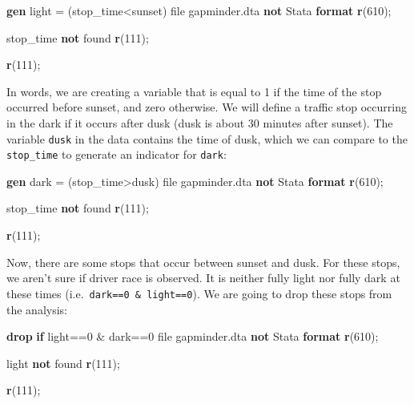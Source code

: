 \documentclass[
]{book}
\newenvironment{Shaded}{\begin{snugshade}}{\end{snugshade}}
\newcommand{\FunctionTok}[1]{\textcolor[rgb]{0.13,0.29,0.53}{\textbf{#1}}}
\newcommand{\KeywordTok}[1]{\textcolor[rgb]{0.13,0.29,0.53}{\textbf{#1}}}
\newcommand{\NormalTok}[1]{#1}
\begin{document}
\begin{Shaded}
\begin{Highlighting}[]
\KeywordTok{gen}\NormalTok{ light = (stop\_time\textless{}sunset)}
\NormalTok{file gapminder.dta }\KeywordTok{not}\NormalTok{ Stata }\KeywordTok{format}
\FunctionTok{r}\NormalTok{(610);}


\NormalTok{stop\_time }\KeywordTok{not}\NormalTok{ found}
\FunctionTok{r}\NormalTok{(111);}

\FunctionTok{r}\NormalTok{(111);}
\end{Highlighting}
\end{Shaded}

In words, we are creating a variable that is equal to 1 if the time of the stop occurred before sunset, and zero otherwise. We will define a traffic stop occurring in the dark if it occurs after dusk (dusk is about 30 minutes after sunset). The variable \texttt{dusk} in the data contains the time of dusk, which we can compare to the \texttt{stop\_time} to generate an indicator for \texttt{dark}:

\begin{Shaded}
\begin{Highlighting}[]
\KeywordTok{gen}\NormalTok{ dark = (stop\_time\textgreater{}dusk)}
\NormalTok{file gapminder.dta }\KeywordTok{not}\NormalTok{ Stata }\KeywordTok{format}
\FunctionTok{r}\NormalTok{(610);}


\NormalTok{stop\_time }\KeywordTok{not}\NormalTok{ found}
\FunctionTok{r}\NormalTok{(111);}

\FunctionTok{r}\NormalTok{(111);}
\end{Highlighting}
\end{Shaded}

Now, there are some stops that occur between sunset and dusk. For these stops, we aren't sure if driver race is observed. It is neither fully light nor fully dark at these times (i.e.~\texttt{dark==0\ \&\ light==0}). We are going to drop these stops from the analysis:

\begin{Shaded}
\begin{Highlighting}[]
\KeywordTok{drop} \KeywordTok{if}\NormalTok{ light==0 \& dark==0 }
\NormalTok{file gapminder.dta }\KeywordTok{not}\NormalTok{ Stata }\KeywordTok{format}
\FunctionTok{r}\NormalTok{(610);}


\NormalTok{light }\KeywordTok{not}\NormalTok{ found}
\FunctionTok{r}\NormalTok{(111);}

\FunctionTok{r}\NormalTok{(111);}
\end{Highlighting}
\end{Shaded}
\end{document}

